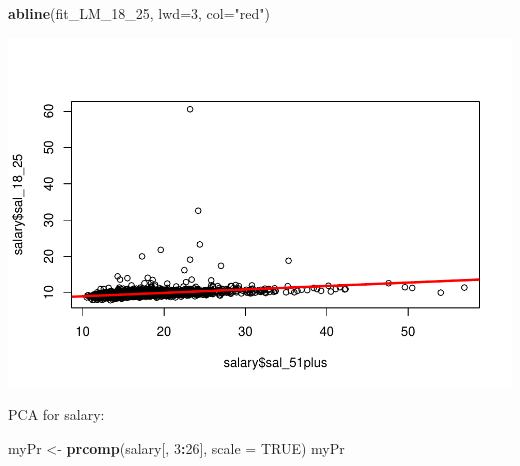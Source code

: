\documentclass[]{article}
\newenvironment{Shaded}{\begin{snugshade}}{\end{snugshade}}
\newcommand{\KeywordTok}[1]{\textcolor[rgb]{0.13,0.29,0.53}{\textbf{#1}}}
\newcommand{\DataTypeTok}[1]{\textcolor[rgb]{0.13,0.29,0.53}{#1}}
\newcommand{\DecValTok}[1]{\textcolor[rgb]{0.00,0.00,0.81}{#1}}
\newcommand{\StringTok}[1]{\textcolor[rgb]{0.31,0.60,0.02}{#1}}
\newcommand{\CommentTok}[1]{\textcolor[rgb]{0.56,0.35,0.01}{\textit{#1}}}
\newcommand{\OtherTok}[1]{\textcolor[rgb]{0.56,0.35,0.01}{#1}}
\newcommand{\OperatorTok}[1]{\textcolor[rgb]{0.81,0.36,0.00}{\textbf{#1}}}
\newcommand{\NormalTok}[1]{#1}
\begin{document}
\begin{Shaded}
\begin{Highlighting}[]
\KeywordTok{abline}\NormalTok{(fit_LM_18_}\DecValTok{25}\NormalTok{, }\DataTypeTok{lwd=}\DecValTok{3}\NormalTok{, }\DataTypeTok{col=}\StringTok{"red"}\NormalTok{)}
\end{Highlighting}
\end{Shaded}

\includegraphics{TSLproject_files/figure-latex/unnamed-chunk-18-4.pdf}

\begin{Shaded}
\end{Shaded}

PCA for salary:

\begin{Shaded}
\begin{Highlighting}[]
\NormalTok{myPr <-}\StringTok{ }\KeywordTok{prcomp}\NormalTok{(salary[, }\DecValTok{3}\OperatorTok{:}\DecValTok{26}\NormalTok{], }\DataTypeTok{scale =} \OtherTok{TRUE}\NormalTok{)}
\NormalTok{myPr}
\end{Highlighting}
\end{Shaded}
\end{document}
